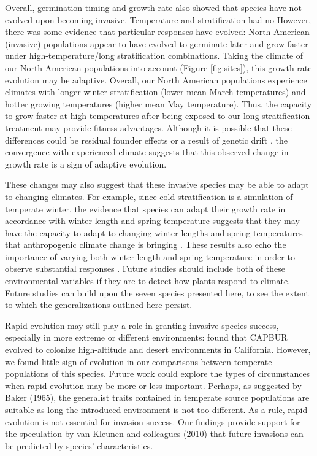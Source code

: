 \documentclass[12pt]{article}\usepackage[]{graphicx}\usepackage[]{color}
\begin{document}
	Overall, germination timing and growth rate also showed that species have not evolved upon becoming invasive. Temperature and stratification had no  However, there was some evidence that particular responses have evolved: North American (invasive) populations appear to have evolved to germinate later and grow faster under high-temperature/long stratification combinations. Taking the climate of our North American populations into account (Figure \ref{fig:sites}), this growth rate evolution may be adaptive. Overall, our North American populations experience climates with longer winter stratification  (lower mean March temperatures) and hotter growing temperatures (higher mean May temperature). Thus, the capacity to grow faster at high temperatures after being exposed to our long stratification treatment may provide fitness advantages. Although it is  possible that these differences could be residual founder effects \parencite{Shirk2014} or a result of genetic drift \parencite{Eckert1996},  the convergence with experienced climate suggests that this observed change in growth rate is a sign of adaptive evolution. 
	
	These changes may also suggest that these invasive species may be able to adapt to changing climates.  For example, since cold-stratification is a simulation of temperate winter, the evidence that species can adapt their growth rate in accordance with winter length and spring temperature suggests that they may have the capacity to adapt to changing winter lengths and spring temperatures that anthropogenic climate change is bringing \parencite{IPCC2015}. These results also echo the  importance of varying both winter length and spring temperature in order to observe substantial responses \parencite[e.g.,][]{Bernareggi2016}. Future studies should include both of these environmental variables if they are to detect how plants respond to climate. Future studies can build upon the seven species presented here, to see the extent to which the generalizations outlined here persist. 
	
Rapid evolution may still play a role in granting invasive species success, especially in more extreme or different environments:  \textcite{Linde2001} found that CAPBUR evolved to colonize high-altitude and desert environments in California. However, we found little sign of evolution in our comparisons between temperate populations of this species. Future work could explore the types of circumstances when rapid evolution may be more or less important. Perhaps, as suggested by Baker (1965), the generalist traits contained in temperate source populations are suitable as long the introduced environment is not too different. As a rule, rapid evolution is not essential for invasion success. Our findings provide support for  the speculation by van Kleunen and colleagues (2010) that future invasions can be predicted by species' characteristics.
	
\end{document}
